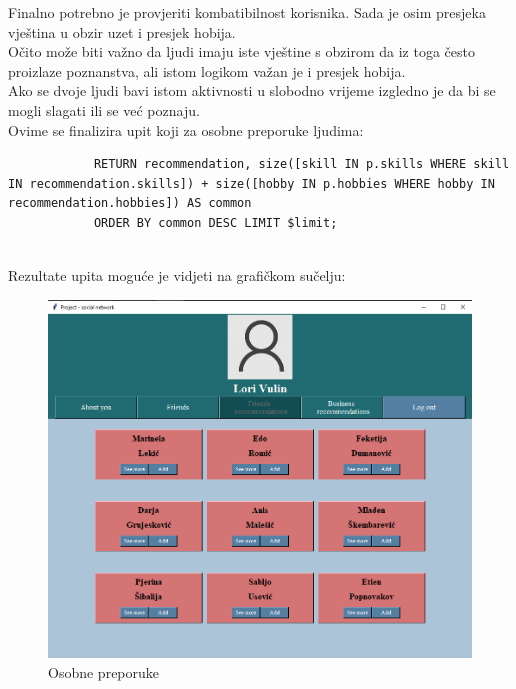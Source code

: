 \documentclass[titlepage, 12pt]{scrartcl}
\begin{document}
	Finalno potrebno je provjeriti kombatibilnost korisnika. Sada je osim presjeka vještina u obzir uzet i presjek hobija. \\
	Očito može biti važno da ljudi imaju iste vještine s obzirom da iz toga često proizlaze poznanstva, ali istom logikom važan je i presjek hobija. \\
	Ako se dvoje ljudi bavi istom aktivnosti u slobodno vrijeme izgledno je da bi se mogli slagati ili se već poznaju. \\
	Ovime se finalizira upit koji za osobne preporuke ljudima:
	\begin{samepage}
		\begin{verbatim}
			RETURN recommendation, size([skill IN p.skills WHERE skill IN recommendation.skills]) + size([hobby IN p.hobbies WHERE hobby IN recommendation.hobbies]) AS common 
			ORDER BY common DESC LIMIT $limit;
			
		\end{verbatim}
	\end{samepage}
	\newpage
	\begin{samepage}
		Rezultate upita moguće je vidjeti na grafičkom sučelju:
		\begin{figure}[h]
			\centering
			\includegraphics[scale=0.4]{slike/personal.jpg}
			\caption{Osobne preporuke}
			\label{fig:personal_rec}
		\end{figure}
	\end{samepage}
	
\end{document}
